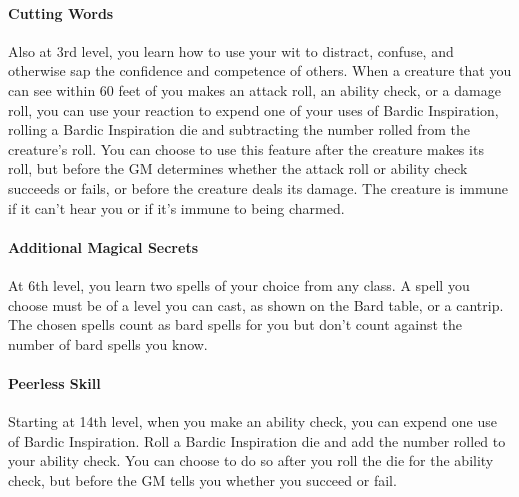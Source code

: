 \hypertarget{cutting-words}{%
\paragraph{Cutting Words}\label{cutting-words}}

Also at 3rd level, you learn how to use your wit to distract, confuse,
and otherwise sap the confidence and competence of others. When a
creature that you can see within 60 feet of you makes an attack roll, an
ability check, or a damage roll, you can use your reaction to expend one
of your uses of Bardic Inspiration, rolling a Bardic Inspiration die and
subtracting the number rolled from the creature's roll. You can choose
to use this feature after the creature makes its roll, but before the GM
determines whether the attack roll or ability check succeeds or fails,
or before the creature deals its damage. The creature is immune if it
can't hear you or if it's immune to being charmed.

\hypertarget{additional-magical-secrets}{%
\paragraph{Additional Magical
Secrets}\label{additional-magical-secrets}}

At 6th level, you learn two spells of your choice from any class. A
spell you choose must be of a level you can cast, as shown on the Bard
table, or a cantrip. The chosen spells count as bard spells for you but
don't count against the number of bard spells you know.

\hypertarget{peerless-skill}{%
\paragraph{Peerless Skill}\label{peerless-skill}}

Starting at 14th level, when you make an ability check, you can expend
one use of Bardic Inspiration. Roll a Bardic Inspiration die and add the
number rolled to your ability check. You can choose to do so after you
roll the die for the ability check, but before the GM tells you whether
you succeed or fail.
